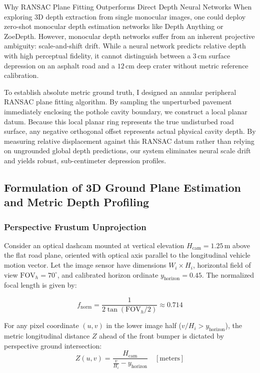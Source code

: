 \begin{designreflection}{Why RANSAC Plane Fitting Outperforms Direct Depth Neural Networks}
When exploring 3D depth extraction from single monocular images, one could deploy zero-shot monocular depth estimation networks like Depth Anything or ZoeDepth. However, monocular depth networks suffer from an inherent projective ambiguity: scale-and-shift drift. While a neural network predicts relative depth with high perceptual fidelity, it cannot distinguish between a $3\,\text{cm}$ surface depression on an asphalt road and a $12\,\text{cm}$ deep crater without metric reference calibration.

To establish absolute metric ground truth, I designed an annular peripheral RANSAC plane fitting algorithm. By sampling the unperturbed pavement immediately enclosing the pothole cavity boundary, we construct a local planar datum. Because this local planar ring represents the true undisturbed road surface, any negative orthogonal offset represents actual physical cavity depth. By measuring relative displacement against this RANSAC datum rather than relying on ungrounded global depth predictions, our system eliminates neural scale drift and yields robust, sub-centimeter depression profiles.
\end{designreflection}

\subsection{Formulation of 3D Ground Plane Estimation and Metric Depth Profiling}

\subsubsection{Perspective Frustum Unprojection}
Consider an optical dashcam mounted at vertical elevation $H_{\text{cam}} = 1.25\,\text{m}$ above the flat road plane, oriented with optical axis parallel to the longitudinal vehicle motion vector. Let the image sensor have dimensions $W_i \times H_i$, horizontal field of view $\text{FOV}_h = 70^\circ$, and calibrated horizon ordinate $y_{\text{horizon}} = 0.45$. The normalized focal length is given by:

\begin{equation}
    f_{\text{norm}} = \frac{1}{2 \tan(\text{FOV}_h / 2)} \approx 0.714
    \label{eq:fnorm_recon}
\end{equation}

For any pixel coordinate $(u, v)$ in the lower image half ($v / H_i > y_{\text{horizon}}$), the metric longitudinal distance $Z$ ahead of the front bumper is dictated by perspective ground intersection:
\begin{equation}
    Z(u, v) = \frac{H_{\text{cam}}}{\frac{v}{H_i} - y_{\text{horizon}}} \quad [\text{meters}]
    \label{eq:z_distance_recon}
\end{equation}

